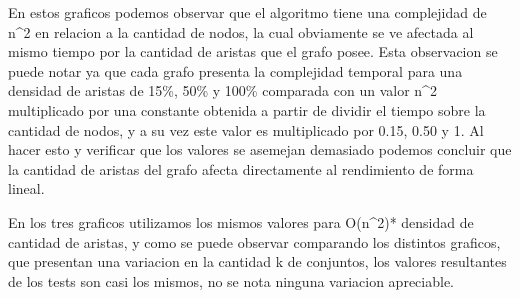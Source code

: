 En estos graficos podemos observar que el algoritmo tiene una complejidad de n^2 en relacion a la cantidad de nodos, la cual obviamente se ve afectada al mismo tiempo por la cantidad de aristas que el grafo posee. Esta observacion se puede notar ya que cada grafo presenta la complejidad temporal para una densidad de aristas de 15\%, 50\% y 100\% comparada con un valor n^2 multiplicado por una constante obtenida a partir de dividir el tiempo sobre la cantidad de nodos, y a su vez este valor es multiplicado por 0.15, 0.50 y 1.
Al hacer esto y verificar que los valores se asemejan demasiado podemos concluir que la cantidad de aristas del grafo afecta directamente al rendimiento de forma lineal.

En los tres graficos utilizamos los mismos valores para O(n^2)* densidad de cantidad de aristas, y como se puede observar comparando los distintos graficos, que presentan una variacion en la cantidad k de conjuntos, los valores resultantes de los tests son casi los mismos, no se nota ninguna variacion apreciable. 




